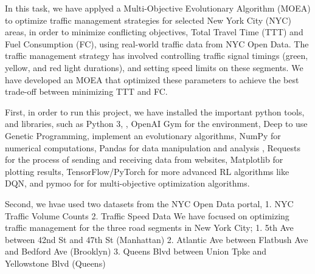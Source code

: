 In this task, we have applyed a Multi-Objective Evolutionary Algorithm (MOEA) to optimize traffic management
strategies for selected New York City (NYC) areas, in order to  minimize conflicting
objectives, Total Travel Time (TTT) and Fuel Consumption (FC), using real-world traffic data
from NYC Open Data. The traffic management strategy has involved controlling traffic signal timings (green, yellow, and 
red light durations), and setting speed limits on these segments. We have developed an MOEA that optimized these parameters to achieve the best trade-off 
between minimizing TTT and FC.

First, in order to run this project, we have installed the important python tools, and libraries, such as Python 3, 
, OpenAI Gym for the environment, Deep to use Genetic Programming, implement an evolutionary algorithms,
NumPy for numerical computations, Pandas for data manipulation and analysis
, Requests for the process of sending and receiving data from websites,
Matplotlib for plotting results, TensorFlow/PyTorch for more advanced RL algorithms like DQN,
and pymoo for for multi-objective optimization algorithms.

Second, we hvae used two datasets from the NYC Open Data portal,
1. NYC Traffic Volume Counts
2. Traffic Speed Data
We have focused on optimizing traffic management for the three road segments in New 
York City;  
1. 5th Ave between 42nd St and 47th St (Manhattan) 
2. Atlantic Ave between Flatbush Ave and Bedford Ave (Brooklyn) 
3. Queens Blvd between Union Tpke and Yellowstone Blvd (Queens) 





